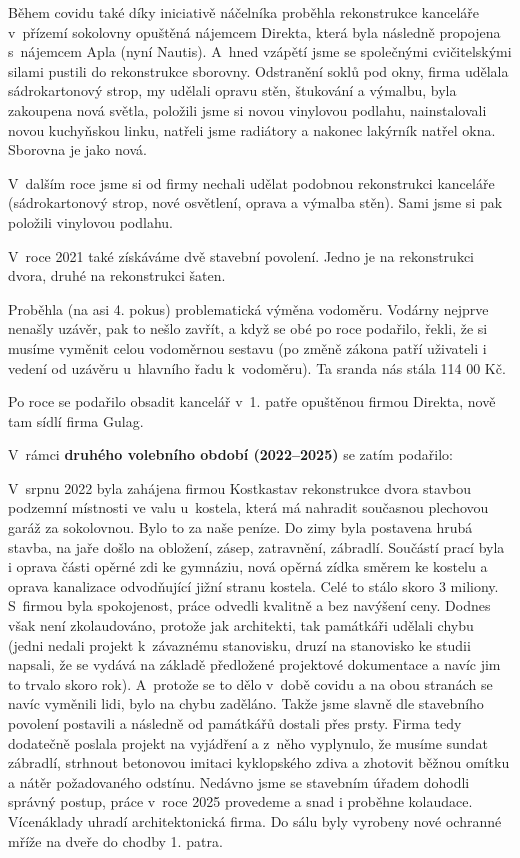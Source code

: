 \documentclass[11pt]{article}
\begin{document}
Během covidu také díky iniciativě náčelníka proběhla rekonstrukce kanceláře v~přízemí sokolovny opuštěná nájemcem Direkta, která byla následně propojena s~nájemcem Apla (nyní Nautis). A~hned vzápětí jsme se společnými cvičitelskými silami pustili do rekonstrukce sborovny. Odstranění soklů pod okny, firma udělala sádrokartonový strop, my udělali opravu stěn, štukování a výmalbu, byla zakoupena nová světla, položili jsme si novou vinylovou podlahu, nainstalovali novou kuchyňskou linku, natřeli jsme radiátory a nakonec lakýrník natřel okna. Sborovna je jako nová.

V~dalším roce jsme si od firmy nechali udělat podobnou rekonstrukci kanceláře (sádrokartonový strop, nové osvětlení, oprava a výmalba stěn). Sami jsme si pak položili vinylovou podlahu.

V~roce 2021 také získáváme dvě stavební povolení. Jedno je na rekonstrukci dvora, druhé na rekonstrukci šaten.

Proběhla (na asi 4. pokus) problematická výměna vodoměru. Vodárny nejprve nenašly uzávěr, pak to nešlo zavřít, a když se obé po roce podařilo, řekli, že si musíme vyměnit celou vodoměrnou sestavu (po změně zákona patří uživateli i vedení od uzávěru u~hlavního řadu k~vodoměru). Ta sranda nás stála 114 00 Kč.

Po roce se podařilo obsadit kancelář v~1. patře opuštěnou firmou Direkta, nově tam sídlí firma Gulag.


V~rámci \textbf{druhého volebního období (2022–2025)} se zatím podařilo: 

V~srpnu 2022 byla zahájena firmou Kostkastav rekonstrukce dvora stavbou podzemní místnosti ve valu u~kostela, která má nahradit současnou plechovou garáž za sokolovnou. Bylo to za naše peníze. Do zimy byla postavena hrubá stavba, na jaře došlo na obložení, zásep, zatravnění, zábradlí. Součástí prací byla i oprava části opěrné zdi ke gymnáziu, nová opěrná zídka směrem ke kostelu a oprava kanalizace odvodňující jižní stranu kostela. Celé to stálo skoro 3 miliony. S~firmou byla spokojenost, práce odvedli kvalitně a bez navýšení ceny. Dodnes však není zkolaudováno, protože jak architekti, tak památkáři udělali chybu (jedni nedali projekt k~závaznému stanovisku, druzí na stanovisko ke studii napsali, že se vydává na základě předložené projektové dokumentace a navíc jim to trvalo skoro rok). A~protože se to dělo v~době covidu a na obou stranách se navíc vyměnili lidi, bylo na chybu zaděláno. Takže jsme slavně dle stavebního povolení postavili a následně od památkářů dostali přes prsty. Firma tedy dodatečně poslala projekt na vyjádření a z~něho vyplynulo, že musíme sundat zábradlí, strhnout betonovou imitaci kyklopského zdiva a zhotovit běžnou omítku a nátěr požadovaného odstínu. Nedávno jsme se stavebním úřadem dohodli správný postup, práce v~roce 2025 provedeme a snad i proběhne kolaudace. Vícenáklady uhradí architektonická firma.
Do sálu byly vyrobeny nové ochranné mříže na dveře do chodby 1. patra.
\end{document}
